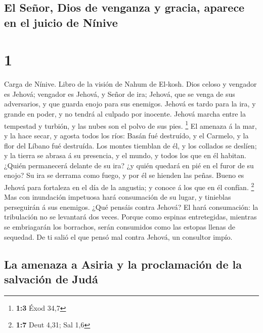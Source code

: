 \hypertarget{el-seuxf1or-dios-de-venganza-y-gracia-aparece-en-el-juicio-de-nuxednive}{%
\subsection{El Señor, Dios de venganza y gracia, aparece en el juicio de
Nínive}\label{el-seuxf1or-dios-de-venganza-y-gracia-aparece-en-el-juicio-de-nuxednive}}

\hypertarget{section}{%
\section{1}\label{section}}

 Carga de Nínive. Libro de la visión de Nahum de El-kosh.
 Dios celoso y vengador es Jehová; vengador es Jehová, y
Señor de ira; Jehová, que se venga de sus adversarios, y que guarda
enojo para sus enemigos.  Jehová es tardo para la ira, y
grande en poder, y no tendrá al culpado por inocente. Jehová marcha
entre la tempestad y turbión, y las nubes son el polvo de sus pies.
\footnote{\textbf{1:3} Éxod 34,7}  El amenaza á la mar, y
la hace secar, y agosta todos los ríos: Basán fué destruído, y el
Carmelo, y la flor del Líbano fué destruída.  Los montes
tiemblan de él, y los collados se deslíen; y la tierra se abrasa á su
presencia, y el mundo, y todos los que en él habitan. 
¿Quién permanecerá delante de su ira? ¿y quién quedará en pié en el
furor de su enojo? Su ira se derrama como fuego, y por él se hienden las
peñas.  Bueno es Jehová para fortaleza en el día de la
angustia; y conoce á los que en él confían. \footnote{\textbf{1:7} Deut
  4,31; Sal 1,6}  Mas con inundación impetuosa hará
consumación de su lugar, y tinieblas perseguirán á sus enemigos.
 ¿Qué pensáis contra Jehová? El hará consumación: la
tribulación no se levantará dos veces.  Porque como
espinas entretegidas, mientras se embriagarán los borrachos, serán
consumidos como las estopas llenas de sequedad.  De ti
salió el que pensó mal contra Jehová, un consultor impío.

\hypertarget{la-amenaza-a-asiria-y-la-proclamaciuxf3n-de-la-salvaciuxf3n-de-juduxe1}{%
\subsection{La amenaza a Asiria y la proclamación de la salvación de
Judá}\label{la-amenaza-a-asiria-y-la-proclamaciuxf3n-de-la-salvaciuxf3n-de-juduxe1}}

